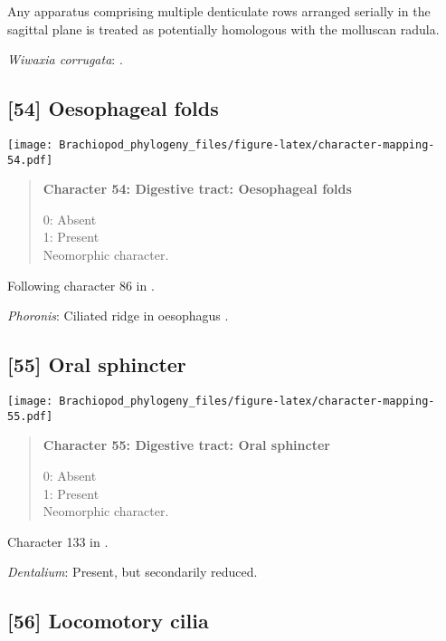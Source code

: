 \documentclass[openany]{book}
\theoremstyle{definition}
\theoremstyle{definition}
\theoremstyle{definition}
\theoremstyle{remark}
\begin{document}
Any apparatus comprising multiple denticulate rows arranged serially in
the sagittal plane is treated as potentially homologous with the
molluscan radula.

\hypertarget{Wiwaxia_corrugata-coding-53}{}
\emph{Wiwaxia corrugata}: \citet{Smith2012M}.

\subsection*{{[}54{]} Oesophageal folds}\label{oesophageal-folds}

\texttt{[image: Brachiopod\_phylogeny\_files/figure-latex/character-mapping-54.pdf]}

\begin{quote}
\textbf{Character 54: Digestive tract: Oesophageal folds}

0: Absent\\
1: Present\\
Neomorphic character.
\end{quote}

Following character 86 in \citet{Giribet2002}.

\hypertarget{Phoronis-coding-54}{}
\emph{Phoronis}: Ciliated ridge in oesophagus \citep{Torrey1901}.

\subsection*{{[}55{]} Oral sphincter}\label{oral-sphincter}

\texttt{[image: Brachiopod\_phylogeny\_files/figure-latex/character-mapping-55.pdf]}

\begin{quote}
\textbf{Character 55: Digestive tract: Oral sphincter}

0: Absent\\
1: Present\\
Neomorphic character.
\end{quote}

Character 133 in \citet{Grobe2007}.

\hypertarget{Dentalium-coding-55}{}
\emph{Dentalium}: Present, but secondarily reduced.

\subsection*{{[}56{]} Locomotory cilia}\label{locomotory-cilia}
\end{document}
